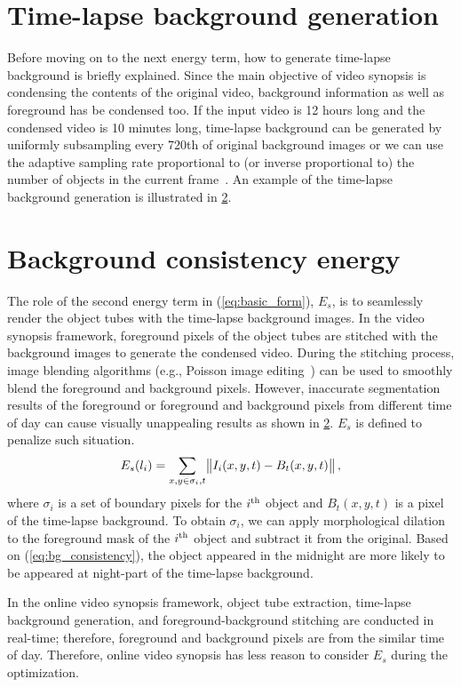 \documentclass[11pt]{hyu_thesis}
\begin{document}
\section{Time-lapse background generation}
Before moving on to the next energy term, how to generate time-lapse background is briefly explained. Since the main objective of video synopsis is condensing the contents of the original video, background information as well as foreground has be condensed too. If the input video is 12 hours long and the condensed video is 10 minutes long, time-lapse background can be generated by uniformly subsampling every 720th of original background images or we can use the adaptive sampling rate proportional to (or inverse proportional to) the number of objects in the current frame~\cite{Pritch2008}. An example of the time-lapse background generation is illustrated in \ref{}.

\section{Background consistency energy}
The role of the second energy term in (\ref{eq:basic_form}), $E_s$, is to seamlessly render the object tubes with the time-lapse background images. In the video synopsis framework, foreground pixels of the object tubes are stitched with the background images to generate the condensed video. During the stitching process, image blending algorithms (e.g., Poisson image editing~\cite{Perez2003}) can be used to smoothly blend the foreground and background pixels. However, inaccurate segmentation results of the foreground or foreground and background pixels from different time of day can cause visually unappealing results as shown in \ref{}. $E_s$ is defined to penalize such situation.
\begin{equation}
\label{eq:bg_consistency}
E_s(l_i)=\sum_{x,y \in \sigma_i,t}\norm{I_i(x,y,t)-B_t(x,y,t)},
\end{equation}
where $\sigma_i$ is a set of boundary pixels for the $i^{\rm{th}}$ object and $B_t(x,y,t)$ is a pixel of the time-lapse background. To obtain $\sigma_i$, we can apply morphological dilation to the foreground mask of the $i^{\rm{th}}$ object and subtract it from the original. Based on (\ref{eq:bg_consistency}), the object appeared in the midnight are more likely to be appeared at night-part of the time-lapse background.

In the online video synopsis framework, object tube extraction, time-lapse background generation, and foreground-background stitching are conducted in real-time; therefore, foreground and background pixels are from the similar time of day. Therefore, online video synopsis has less reason to consider $E_s$ during the optimization.
\end{document}
